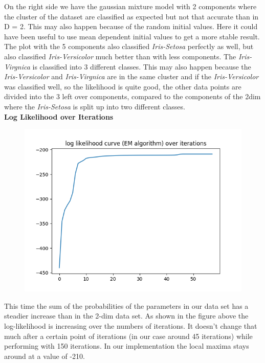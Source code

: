 \documentclass[a4paper]{article}
\begin{document}
\noindent
On the right side we have the gaussian mixture model with 2 components where the cluster of the dataset are classified as expected but not that accurate than in D = 2. This may also happen because of the random initial values. Here it could have been useful to use mean dependent initial values to get a more stable result. The plot with the 5 components also classified \textit{Iris-Setosa} perfectly as well, but also classified \textit{Iris-Versicolor} much better than with less components. The \textit{Iris-Virgnica} is classified into 3 different classes. This may also happen because the \textit{Iris-Versicolor} and \textit{Iris-Virgnica} are in the same cluster and if the \textit{Iris-Versicolor} was classified well, so the likelihood is quite good, the other data points are divided into the 3 left over components, compared to the components of the 2dim where the \textit{Iris-Setosa} is split up into two different classes. \\

\noindent
{\large \textbf{Log Likelihood over Iterations}} \\


\begin{figure}[htp]
\centering
\includegraphics[scale=0.5]{plots/LL_scenario2_cmpnt3.png}
  \label{fig:17}
\end{figure}

\noindent
This time the sum of the probabilities of the parameters in our data set has a steadier increase than in the 2-dim data set.
As shown in the figure above the log-likelihood is increasing over the numbers of iterations. It doesn't change that much after a certain point of iterations (in our case around 45 iterations) while performing with 150 iterations. In our implementation the local maxima stays around at a value of -210.\newline \newline
\end{document}

